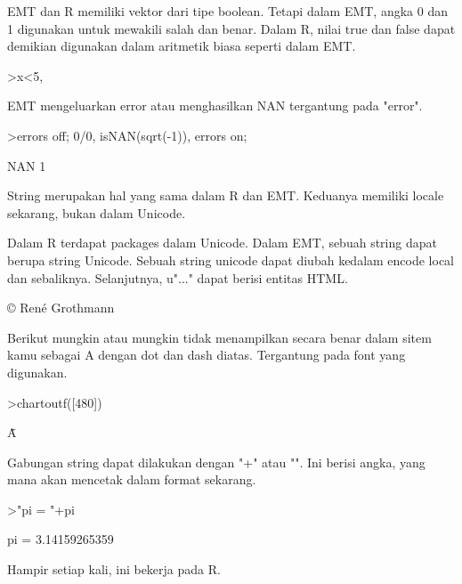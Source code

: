 \documentclass[a4paper,10pt]{article}
\begin{document}
\begin{eulernotebook}
\begin{eulercomment}
\begin{eulercomment}
\begin{eulercomment}
\begin{eulercomment}
\begin{eulercomment}
EMT dan R memiliki vektor dari tipe boolean. Tetapi dalam EMT, angka 0
dan 1 digunakan untuk mewakili salah dan benar. Dalam R, nilai true
dan false dapat demikian digunakan dalam aritmetik biasa seperti dalam
EMT.
\end{eulercomment}
\begin{eulerprompt}
>x<5, %
\end{eulerprompt}
\begin{euleroutput}
  [0,  0,  1,  0,  0]
  [0,  0,  3.1,  0,  0]
\end{euleroutput}
\begin{eulercomment}
EMT mengeluarkan error atau menghasilkan NAN tergantung pada "error".
\end{eulercomment}
\begin{eulerprompt}
>errors off; 0/0, isNAN(sqrt(-1)), errors on;
\end{eulerprompt}
\begin{euleroutput}
  NAN
  1
\end{euleroutput}
\begin{eulercomment}
String merupakan hal yang sama dalam R dan EMT. Keduanya memiliki
locale sekarang, bukan dalam Unicode.

Dalam R terdapat packages dalam Unicode. Dalam EMT, sebuah string
dapat berupa string Unicode. Sebuah string unicode dapat diubah
kedalam encode local dan sebaliknya. Selanjutnya, u"..." dapat berisi
entitas HTML.
\end{eulercomment}
\begin{euleroutput}
  © René Grothmann
\end{euleroutput}
\begin{eulercomment}
Berikut mungkin atau mungkin tidak menampilkan secara benar dalam
sitem kamu sebagai A dengan dot dan dash diatas. Tergantung pada font
yang digunakan.
\end{eulercomment}
\begin{eulerprompt}
>chartoutf([480])
\end{eulerprompt}
\begin{euleroutput}
  Ǡ
\end{euleroutput}
\begin{eulercomment}
Gabungan string dapat dilakukan dengan "+" atau "\textbar{}". Ini berisi angka,
yang mana akan mencetak dalam format sekarang.
\end{eulercomment}
\begin{eulerprompt}
>"pi = "+pi
\end{eulerprompt}
\begin{euleroutput}
  pi = 3.14159265359
\end{euleroutput}
\begin{eulercomment}
Hampir setiap kali, ini bekerja pada R.


\end{eulercomment}
\end{eulercomment}
\end{eulercomment}
\end{eulercomment}
\end{eulercomment}
\end{eulernotebook}
\end{document}
